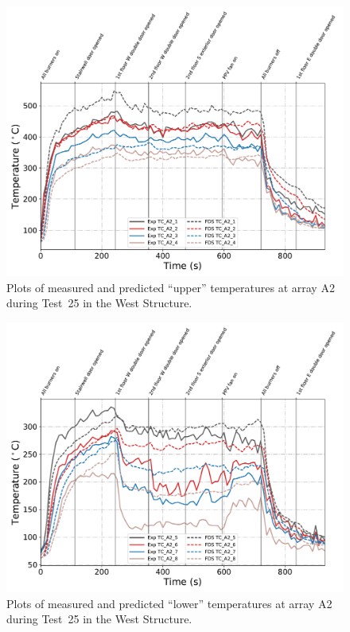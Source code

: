 \begin{figure}[!h]
	\centering
	\includegraphics[width=\columnwidth]{Figures/Plots/Validation/Temperature/Test_25_TC_A2_upper}
	\caption{Plots of measured and predicted ``upper'' temperatures at array A2 during Test~25 in the West Structure.}
	\label{fig:TCA2_upper_data_Test25}
\end{figure}
\begin{figure}[!h]
	\centering
	\includegraphics[width=\columnwidth]{Figures/Plots/Validation/Temperature/Test_25_TC_A2_lower}
	\caption{Plots of measured and predicted ``lower'' temperatures at array A2 during Test~25 in the West Structure.}
	\label{fig:TCA2_lower_data_Test25}
\end{figure}

